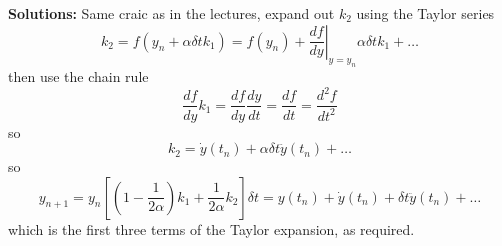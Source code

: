 \documentclass[12pt]{article}
\begin{document}
\begin{enumerate}
\textbf{Solutions: } Same craic as in the lectures, expand out $k_2$ using the Taylor series
\begin{equation}
k_2=f(y_n+\alpha \delta t k_1)=f(y_n)+\left.\frac{df}{dy}\right|_{y=y_n}\alpha \delta t k_1+\ldots
\end{equation}
then use the chain rule 
\begin{equation}
\frac{df}{dy}k_1=\frac{df}{dy}\frac{dy}{dt}=\frac{df}{dt}=\frac{d^2f}{dt^2}
\end{equation}
so
\begin{equation}
k_2=\dot{y}(t_n)+\alpha \delta t \ddot{y}(t_n)+\ldots
\end{equation}
so
\begin{equation}
y_{n+1}=y_n\left[\left(1-\frac{1}{2\alpha}\right)k_1+\frac{1}{2\alpha}k_2\right]\delta t=y(t_n)+\dot{y}(t_n)+\delta t \ddot{y}(t_n)+\ldots
\end{equation}
which is the first three terms of the Taylor expansion, as required.

\end{enumerate}
\end{document}
